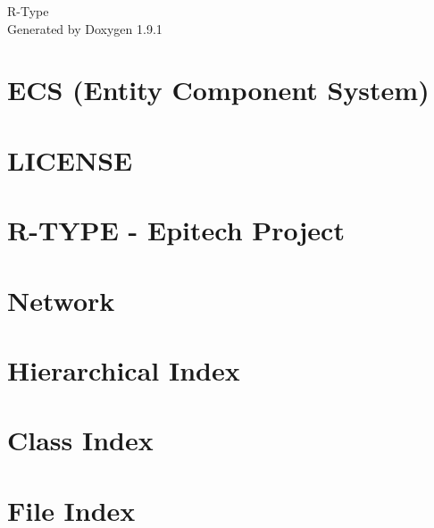\let\mypdfximage\pdfximage\def\pdfximage{\immediate\mypdfximage}\documentclass[twoside]{book}
\newcommand{\+}{\discretionary{\mbox{\scriptsize$\hookleftarrow$}}{}{}}
\newcommand{\clearemptydoublepage}{%
  \newpage{\pagestyle{empty}\cleardoublepage}%
}
\begin{document}
\raggedbottom

\hypersetup{pageanchor=false,
             bookmarksnumbered=true,
             pdfencoding=unicode
            }
\begin{titlepage}
\vspace*{7cm}
\begin{center}%
{\Large R-\/\+Type }\\
\vspace*{1cm}
{\large Generated by Doxygen 1.9.1}\\
\end{center}
\end{titlepage}
\clearemptydoublepage
{}
\tableofcontents
\clearemptydoublepage
{}
\hypersetup{pageanchor=true}

\chapter{ECS (Entity Component System)}
\label{md_Engine_README}

\chapter{LICENSE}
\label{md_LICENSE}

\chapter{R-\/\+TYPE -\/ Epitech Project}
\label{md_README}

\chapter{Network}
\label{md_shared_README}

\chapter{Hierarchical Index}

\chapter{Class Index}

\chapter{File Index}

\end{document}
